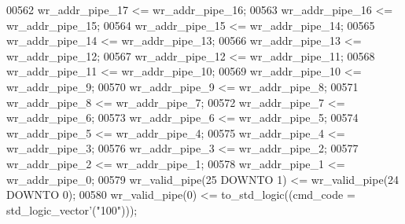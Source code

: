 \begin{DoxyCode}
00562         \textcolor{vhdlchar}{wr_addr_pipe_17} \textcolor{vhdlchar}{<=} \textcolor{vhdlchar}{wr_addr_pipe_16};
00563         \textcolor{vhdlchar}{wr_addr_pipe_16} \textcolor{vhdlchar}{<=} \textcolor{vhdlchar}{wr_addr_pipe_15};
00564         \textcolor{vhdlchar}{wr_addr_pipe_15} \textcolor{vhdlchar}{<=} \textcolor{vhdlchar}{wr_addr_pipe_14};
00565         \textcolor{vhdlchar}{wr_addr_pipe_14} \textcolor{vhdlchar}{<=} \textcolor{vhdlchar}{wr_addr_pipe_13};
00566         \textcolor{vhdlchar}{wr_addr_pipe_13} \textcolor{vhdlchar}{<=} \textcolor{vhdlchar}{wr_addr_pipe_12};
00567         \textcolor{vhdlchar}{wr_addr_pipe_12} \textcolor{vhdlchar}{<=} \textcolor{vhdlchar}{wr_addr_pipe_11};
00568         \textcolor{vhdlchar}{wr_addr_pipe_11} \textcolor{vhdlchar}{<=} \textcolor{vhdlchar}{wr_addr_pipe_10};
00569         \textcolor{vhdlchar}{wr_addr_pipe_10} \textcolor{vhdlchar}{<=} \textcolor{vhdlchar}{wr_addr_pipe_9};
00570         \textcolor{vhdlchar}{wr_addr_pipe_9} \textcolor{vhdlchar}{<=} \textcolor{vhdlchar}{wr_addr_pipe_8};
00571         \textcolor{vhdlchar}{wr_addr_pipe_8} \textcolor{vhdlchar}{<=} \textcolor{vhdlchar}{wr_addr_pipe_7};
00572         \textcolor{vhdlchar}{wr_addr_pipe_7} \textcolor{vhdlchar}{<=} \textcolor{vhdlchar}{wr_addr_pipe_6};
00573         \textcolor{vhdlchar}{wr_addr_pipe_6} \textcolor{vhdlchar}{<=} \textcolor{vhdlchar}{wr_addr_pipe_5};
00574         \textcolor{vhdlchar}{wr_addr_pipe_5} \textcolor{vhdlchar}{<=} \textcolor{vhdlchar}{wr_addr_pipe_4};
00575         \textcolor{vhdlchar}{wr_addr_pipe_4} \textcolor{vhdlchar}{<=} \textcolor{vhdlchar}{wr_addr_pipe_3};
00576         \textcolor{vhdlchar}{wr_addr_pipe_3} \textcolor{vhdlchar}{<=} \textcolor{vhdlchar}{wr_addr_pipe_2};
00577         \textcolor{vhdlchar}{wr_addr_pipe_2} \textcolor{vhdlchar}{<=} \textcolor{vhdlchar}{wr_addr_pipe_1};
00578         \textcolor{vhdlchar}{wr_addr_pipe_1} \textcolor{vhdlchar}{<=} \textcolor{vhdlchar}{wr_addr_pipe_0};
00579         \textcolor{vhdlchar}{wr_valid_pipe}\textcolor{vhdlchar}{(}\textcolor{vhdllogic}{}\textcolor{vhdllogic}{25} \textcolor{keywordflow}{DOWNTO} \textcolor{vhdllogic}{}\textcolor{vhdllogic}{1}\textcolor{vhdlchar}{)} \textcolor{vhdlchar}{<=} \textcolor{vhdlchar}{wr_valid_pipe}\textcolor{vhdlchar}{(}\textcolor{vhdllogic}{}\textcolor{vhdllogic}{24} \textcolor{keywordflow}{DOWNTO} \textcolor{vhdllogic}{}\textcolor{vhdllogic}{0}\textcolor{vhdlchar}{)};
00580         \textcolor{vhdlchar}{wr_valid_pipe}\textcolor{vhdlchar}{(}\textcolor{vhdllogic}{}\textcolor{vhdllogic}{0}\textcolor{vhdlchar}{)} \textcolor{vhdlchar}{<=} \textcolor{vhdlchar}{to\_std\_logic}\textcolor{vhdlchar}{(}\textcolor{vhdlchar}{(}\textcolor{vhdlchar}{cmd_code} \textcolor{vhdlchar}{=} \textcolor{comment}{std\_logic\_vector}\textcolor{vhdlchar}{'}\textcolor{vhdlchar}{(}\textcolor{vhdllogic}{"100"}\textcolor{vhdlchar}{)}\textcolor{vhdlchar}{)}\textcolor{vhdlchar}{)};

\end{DoxyCode}
